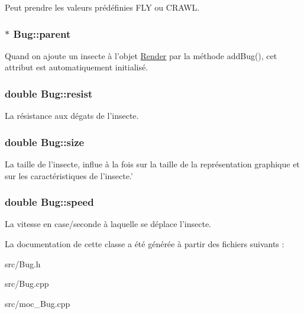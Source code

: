 \label{classBug_a00484a34d1e537e92b0bba7e2e5ddbeb}
Peut prendre les valeurs prédéfinies FLY ou CRAWL. \hypertarget{classBug_a7a93aae4e4b7a215c94ff85d0bd6e26d}{
\subsubsection[{parent}]{$\ast$ {\bf Bug::parent}}}
\label{classBug_a7a93aae4e4b7a215c94ff85d0bd6e26d}
Quand on ajoute un insecte à l'objet \hyperlink{classRender}{Render} par la méthode addBug(), cet attribut est automatiquement initialisé. \hypertarget{classBug_a98590009992312ec6508e334bd02e529}{
\subsubsection[{resist}]{\setlength{\rightskip}{0pt plus 5cm}double {\bf Bug::resist}}}
\label{classBug_a98590009992312ec6508e334bd02e529}
La résistance aux dégats de l'insecte. \hypertarget{classBug_a27a0f0b84d15525e409955509e6e3c42}{
\subsubsection[{size}]{\setlength{\rightskip}{0pt plus 5cm}double {\bf Bug::size}}}
\label{classBug_a27a0f0b84d15525e409955509e6e3c42}
La taille de l'insecte, influe à la fois sur la taille de la représentation graphique et sur les caractéristiques de l'insecte.' \hypertarget{classBug_a13b95fbf23748ea853b01bfd0b0e7fc8}{
\subsubsection[{speed}]{\setlength{\rightskip}{0pt plus 5cm}double {\bf Bug::speed}}}
\label{classBug_a13b95fbf23748ea853b01bfd0b0e7fc8}
La vitesse en case/seconde à laquelle se déplace l'insecte. 

La documentation de cette classe a été générée à partir des fichiers suivants :\begin{DoxyCompactItemize}
\item 
src/Bug.h\item 
src/Bug.cpp\item 
src/moc\_\-Bug.cpp\end{DoxyCompactItemize}
